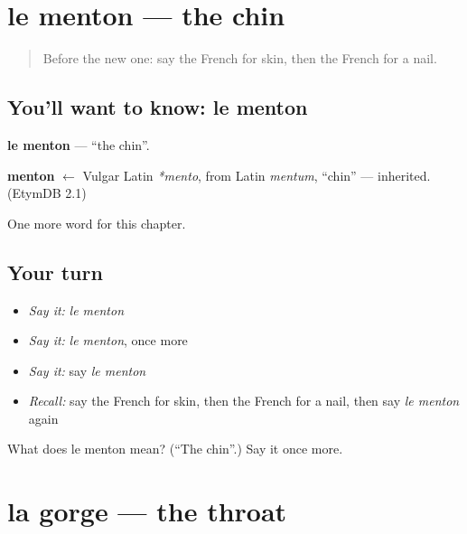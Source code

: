 \section[le menton]{le menton — the chin}

\label{lesson:FR-C51-menton}



\begin{quote}
Before the new one: say the French for skin, then the French for a nail.
\end{quote}

\subsection*{You'll want to know: le menton}
\textbf{le menton} — \textquotedblleft{}the chin\textquotedblright{}.

\begin{cousinweb}
\textbf{menton} $\leftarrow$ Vulgar Latin \emph{*mento}, from Latin \emph{mentum}, \textquotedblleft{}chin\textquotedblright{} — inherited. (EtymDB 2.1)
\end{cousinweb}

\begin{grammarlens}[title={What you've built}]
One more word for this chapter.
\end{grammarlens}

\subsection*{Your turn}
\begin{itemize}
\raggedright
  \item \emph{Say it:} \emph{le menton}
  \item \emph{Say it:} \emph{le menton}, once more
  \item \emph{Say it:} say \emph{le menton}
  \item \emph{Recall:} say the French for skin, then the French for a nail, then say \emph{le menton} again
\end{itemize}

\begin{tcolorbox}[breakable,colback=teal!4,colframe=teal!35!black,title={Before you move on}]
What does le menton mean? (\textquotedblleft{}The chin\textquotedblright{}.) Say it once more.
\end{tcolorbox}
\section[la gorge]{la gorge — the throat}

